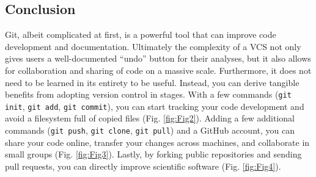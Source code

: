 \subsection*{Conclusion}

Git, albeit complicated at first, is a powerful tool that can improve code development and documentation.
Ultimately the complexity of a VCS not only gives users a well-documented ``undo'' button for their analyses, but it also allows for collaboration and sharing of code on a massive scale.
Furthermore, it does not need to be learned in its entirety to be useful.
Instead, you can derive tangible benefits from adopting version control in stages.
With a few commands (\verb|git init|, \verb|git add|, \verb|git commit|), you can start tracking your code development and avoid a filesystem full of copied files (Fig. \ref{fig:Fig2}).
Adding a few additional commands (\verb|git push|, \verb|git clone|, \verb|git pull|) and a GitHub account, you can share your code online, transfer your changes across machines, and collaborate in small groups (Fig. \ref{fig:Fig3}).
Lastly, by forking public repositories and sending pull requests, you can directly improve scientific software (Fig. \ref{fig:Fig4}).
